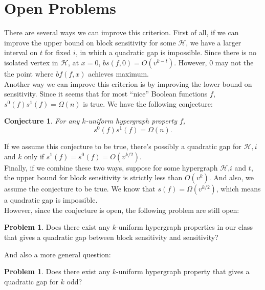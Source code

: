 \documentclass[psamsfonts]{amsart}
\newtheorem{conj}{Conjecture}
\theoremstyle{definition}
\newtheorem{prob}[theorem]{Problem}
\theoremstyle{remark}
\numberwithin{equation}{section}
\begin{document}
	\section{Open Problems}
		\indent There are several ways we can improve this criterion. First of all, if we can improve the upper bound on block sensitivity for some $\mathcal{H}$, we have a larger interval on $t$ for fixed $i$, in which a quadratic gap is impossible. Since there is no isolated vertex in $\mathcal{H}$, at $x=0$, $bs(f,0) = O(v^{k-t})$. However, $0$ may not the the point where $bf(f,x)$ achieves maximum.\\
		\indent Another way we can improve this criterion is by improving the lower bound on sensitivity. Since it seems that for most ``nice'' Boolean functions $f$, $s^0(f)s^1(f) = \Omega(n)$ is true. We have the following conjecture:
		\begin{conj}
			For any $k$-uniform hypergraph property $f$, 
			\begin{equation}
				s^0(f)s^1(f) = \Omega(n). \nonumber
			\end{equation}
		\end{conj}		
		If we assume this conjecture to be true, there's possibly a quadratic gap for $\mathcal{H},i$ and $k$ only if $s^1(f) = s^0(f) = O(v^{k/2})$.\\
		\indent Finally, if we combine these two ways, suppose for some hypergraph $\mathcal{H}$,$i$ and $t$, the upper bound for block sensitivity is strictly less than $O(v^k)$. And also, we assume the conjecture to be true. We know that $s(f) = \Omega(v^{k/2})$, which means a quadratic gap is impossible.\\
		\indent However, since the conjecture is open, the following problem are still open:
		\begin{prob}
			Does there exist any $k$-uniform hypergraph properties in our class that gives a quadratic gap between block sensitivity and sensitivity? 
		\end{prob}
		And also a more general question:
		\begin{prob}
			Does there exist any $k$-uniform hypergraph property that gives a quadratic gap for $k$ odd?
		\end{prob}
	
\end{document}
